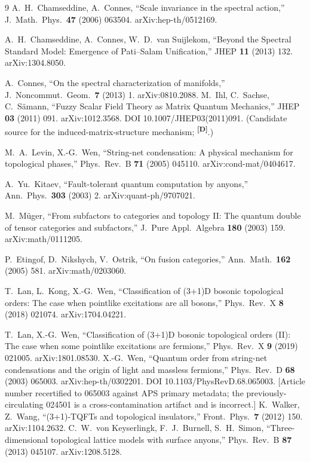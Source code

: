 \documentclass[12pt,a4paper,twoside]{article}
\theoremstyle{plain}
\theoremstyle{definition}
\theoremstyle{remark}
\newcommand{\catmark}[1]{\textsuperscript{\textsf{\textbf{[#1]}}}}
\begin{document}
\begin{thebibliography}{9}
A.~H.~Chamseddine, A.~Connes, ``Scale invariance in the spectral action,'' J.\ Math.\ Phys.\ \textbf{47} (2006) 063504. arXiv:hep-th/0512169.

A.~H.~Chamseddine, A.~Connes, W.~D.~van Suijlekom, ``Beyond the Spectral Standard Model: Emergence of Pati--Salam Unification,'' JHEP \textbf{11} (2013) 132. arXiv:1304.8050.

A.~Connes, ``On the spectral characterization of manifolds,'' J.\ Noncommut.\ Geom.\ \textbf{7} (2013) 1. arXiv:0810.2088.
M.~Ihl, C.~Sachse, C.~S\"amann, ``Fuzzy Scalar Field Theory as Matrix Quantum Mechanics,'' JHEP \textbf{03} (2011) 091. arXiv:1012.3568. DOI 10.1007/JHEP03(2011)091. (Candidate source for the induced-matrix-structure mechanism; \catmark{D}.)

M.~A.~Levin, X.-G.~Wen, ``String-net condensation: A physical mechanism for topological phases,'' Phys.\ Rev.\ B \textbf{71} (2005) 045110. arXiv:cond-mat/0404617.

A.~Yu.~Kitaev, ``Fault-tolerant quantum computation by anyons,'' Ann.\ Phys.\ \textbf{303} (2003) 2. arXiv:quant-ph/9707021.

M.~M\"uger, ``From subfactors to categories and topology II: The quantum double of tensor categories and subfactors,'' J.\ Pure Appl.\ Algebra \textbf{180} (2003) 159. arXiv:math/0111205.

P.~Etingof, D.~Nikshych, V.~Ostrik, ``On fusion categories,'' Ann.\ Math.\ \textbf{162} (2005) 581. arXiv:math/0203060.

T.~Lan, L.~Kong, X.-G.~Wen, ``Classification of (3+1)D bosonic topological orders: The case when pointlike excitations are all bosons,'' Phys.\ Rev.\ X \textbf{8} (2018) 021074. arXiv:1704.04221.

T.~Lan, X.-G.~Wen, ``Classification of (3+1)D bosonic topological orders (II): The case when some pointlike excitations are fermions,'' Phys.\ Rev.\ X \textbf{9} (2019) 021005. arXiv:1801.08530.
X.-G.~Wen, ``Quantum order from string-net condensations and the origin of light and massless fermions,'' Phys.\ Rev.\ D \textbf{68} (2003) 065003. arXiv:hep-th/0302201. DOI 10.1103/PhysRevD.68.065003. [Article number recertified to 065003 against APS primary metadata; the previously-circulating 024501 is a cross-contamination artifact and is incorrect.]
K.~Walker, Z.~Wang, ``(3+1)-TQFTs and topological insulators,'' Front.\ Phys.\ \textbf{7} (2012) 150. arXiv:1104.2632.
C.~W.~von Keyserlingk, F.~J.~Burnell, S.~H.~Simon, ``Three-dimensional topological lattice models with surface anyons,'' Phys.\ Rev.\ B \textbf{87} (2013) 045107. arXiv:1208.5128.


\end{thebibliography}
\end{document}
